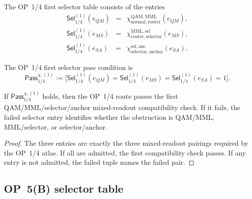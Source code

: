 \begin{definition}
\label{def:v410r21-op14-first-selector-table}
The OP~1/4 first selector table consists of the entries
\[
\begin{array}{rcl}
\mathsf{Sel}^{(1)}_{1/4}(e_{QM}) &=&
\chi^{\mathrm{QAM},\mathrm{MML}}_{\mathrm{normal},\mathrm{router}}(e_{QM}),\\
\mathsf{Sel}^{(1)}_{1/4}(e_{MS}) &=&
\chi^{\mathrm{MML},\mathrm{sel}}_{\mathrm{router},\mathrm{selector}}(e_{MS}),\\
\mathsf{Sel}^{(1)}_{1/4}(e_{SA}) &=&
\chi^{\mathrm{sel},\mathrm{anc}}_{\mathrm{selector},\mathrm{anchor}}(e_{SA}).
\end{array}
\]
\end{definition}

\begin{definition}
\label{def:v410r21-op14-selector-pass}
The OP~1/4 first selector pass condition is
\[
 \mathsf{Pass}_{1/4}^{\chi,(1)}
 :=
 \bigl[
 \mathsf{Sel}^{(1)}_{1/4}(e_{QM})=
 \mathsf{Sel}^{(1)}_{1/4}(e_{MS})=
 \mathsf{Sel}^{(1)}_{1/4}(e_{SA})=1
 \bigr].
\]
\end{definition}

\begin{proposition}
\label{prop:v410r21-op14-first-selector-diagnostic}
If \(\mathsf{Pass}_{1/4}^{\chi,(1)}\) holds, then the OP~1/4 route passes the
first QAM/MML/selector/anchor mixed-readout compatibility check. If it fails,
the failed selector entry identifies whether the obstruction is QAM/MML,
MML/selector, or selector/anchor.
\end{proposition}

\begin{proof}
The three entries are exactly the three mixed-readout pairings required by the
OP~1/4 atlas. If all are admitted, the first compatibility check passes.
If any entry is not admitted, the failed tuple names the failed pair.
\end{proof}

\subsection{OP~5(B) selector table}
\label{subsec:v410r21-op5b-selector-table}

